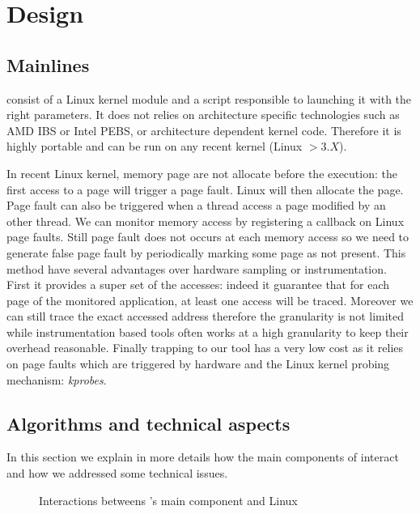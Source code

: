 \section{Design}
\label{sec:design}

\subsection{Mainlines}

\Moca consist of a Linux kernel module and a script responsible to launching it
with the right parameters. It does not relies on architecture specific
technologies such as AMD IBS or Intel PEBS, or architecture dependent kernel
code. Therefore it is highly portable and can be run on any recent kernel
(Linux $> 3.X$).

In recent Linux kernel, memory page are not allocate before the execution: the
first access to a page will trigger a page fault. Linux will then allocate the
page. Page fault can also be triggered when a thread access a page modified by
an other thread. We can monitor memory access by registering a callback on
Linux page faults. Still page fault does not occurs at each memory access so
we need to generate false page fault by periodically marking some page as not
present. This method have several advantages over hardware sampling or
instrumentation. First it provides a super set of the accesses: indeed it
guarantee that for each page of the monitored application, at least one access
will be traced. Moreover we can still trace the exact accessed address
therefore the granularity is not limited while instrumentation based tools
often works at a high granularity to keep their overhead reasonable.  Finally
trapping to our tool has a very low cost as it relies on page faults which
are triggered by hardware and the Linux kernel probing mechanism:
\emph{kprobes}.

\subsection{Algorithms and technical aspects}
\label{sec:design-tech}

In this section we explain in more details how the main components of \Moca
interact and how we addressed some technical issues.

\begin{figure}[htb]
    \centering
    \caption{Interactions betweens \Moca's main component and Linux}
    \label{fig:moca}
\end{figure}


